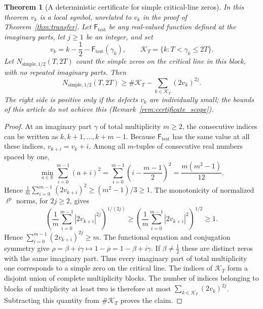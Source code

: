 \documentclass[11pt,a4paper]{article}
\makeatletter
\numberwithin{equation}{section}
\DeclareRobustCommand{\CGref}[1]{\ref{#1}}
\let\CG@origref\ref
\newcommand{\CG@gettip}[1]{\@ifundefined{CGTip@#1}{#1}{\csname CGTip@#1\endcsname}}
\DeclareRobustCommand{\CGref}[1]{\pdftooltip{\CG@origref{#1}}{\CG@gettip{#1}}}
\newtheorem{theorem}{Theorem}[section]
\theoremstyle{definition}
\theoremstyle{remark}
\makeatother
\begin{document}
\begin{theorem}[A deterministic certificate for simple critical-line zeros]\label{thm:recovered_simple_certificate}
In this theorem $v_k$ is a local symbol, unrelated to $v_k$ in the proof of Theorem~\CGref{thm:transfer}. Let $\mathsf F_{\mathrm{test}}$ be any real-valued function defined at the imaginary parts,
let $j\ge1$ be an integer, and set
\begin{equation}
v_k=k-\frac12-\mathsf F_{\mathrm{test}}(\gamma_k),\qquad
\mathcal K_T=\{k:T<\gamma_k\le2T\}.
\label{eq:disp_46}
\end{equation}
Let $N_{\mathrm{simple},1/2}(T,2T)$ count the simple zeros on the
critical line in this block, with no repeated imaginary parts. Then
\begin{equation}
N_{\mathrm{simple},1/2}(T,2T)
\ge\#\mathcal K_T-\sum_{k\in\mathcal K_T}(2v_k)^{2j}.
\label{eq:recovered_simple_certificate}
\end{equation}
The right side is positive only if the defects $v_k$ are individually small; the bounds of this article do not achieve this (Remark~\CGref{rem:certificate_scope}).
\end{theorem}
\begin{proof}
At an imaginary part $\gamma$ of total multiplicity $m\ge2$, the consecutive
indices can be written as $k,k+1,\ldots,k+m-1$. Because $\mathsf F_{\mathrm{test}}$ has the
same value at all these indices, $v_{k+i}=v_k+i$.
Among all $m$-tuples of consecutive real numbers spaced by one,
\begin{equation}
\min_{a\in\mathbb R}\sum_{i=0}^{m-1}(a+i)^2
=\sum_{i=0}^{m-1}\left(i-\frac{m-1}{2}\right)^2
=\frac{m(m^2-1)}{12}.
\label{eq:disp_47}
\end{equation}
Hence
$\frac1m\sum_{i=0}^{m-1}(2v_{k+i})^2\ge(m^2-1)/3\ge1$.
The monotonicity of normalized $\ell^p$ norms, for $2j\ge2$, gives
\begin{equation}
\left(\frac1m\sum_{i=0}^{m-1}|2v_{k+i}|^{2j}\right)^{1/(2j)}
\ge\left(\frac1m\sum_{i=0}^{m-1}|2v_{k+i}|^2\right)^{1/2}\ge1.
\label{eq:disp_48}
\end{equation}
Hence $\sum_{i=0}^{m-1}(2v_{k+i})^{2j}\ge m$.
The functional equation and conjugation symmetry give
$\rho=\beta+i\gamma\mapsto1-\overline\rho=1-\beta+i\gamma$.
If $\beta\ne\frac12$ these are distinct zeros with the same imaginary part.
Thus every imaginary part of total multiplicity one corresponds to a simple
zero on the critical line.
The indices of $\mathcal K_T$ form a disjoint union of complete
multiplicity blocks. The number of indices belonging to blocks of
multiplicity at least two is therefore at most
$\sum_{k\in\mathcal K_T}(2v_k)^{2j}$.
Subtracting this quantity from $\#\mathcal K_T$ proves the claim.
\end{proof}
\end{document}
